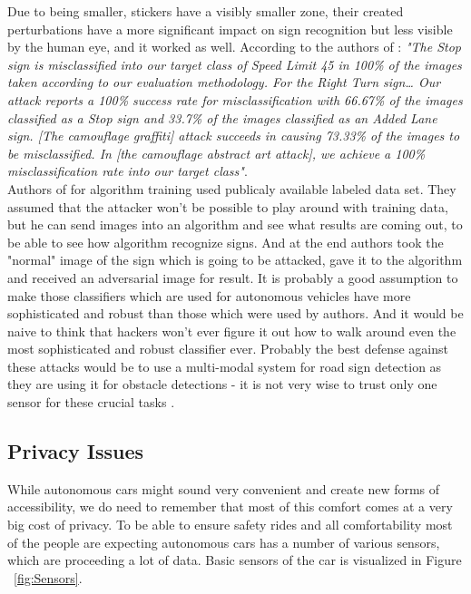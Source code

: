 Due to being smaller, stickers have a visibly smaller zone, their created perturbations have a more significant impact on sign recognition but less visible by the human eye, and it worked as well. According to the authors of \cite{signs}: \textit{"The Stop sign is misclassified into our target class of Speed Limit 45 in 100\% of the images taken according to our evaluation methodology. For the Right Turn sign… Our attack reports a 100\% success rate for misclassification with 66.67\% of the images classified as a Stop sign and 33.7\% of the images classified as an Added Lane sign. [The camouflage graffiti] attack succeeds in causing 73.33\% of the images to be misclassified. In [the camouflage abstract art attack], we achieve a 100\% misclassification rate into our target class"}. \\
Authors of \cite{signs} for algorithm training used publicaly available labeled data set. They assumed that the attacker won't be possible to play around with training data, but he can send images into an algorithm and see what results are coming out, to be able to see how algorithm recognize signs. And at the end authors took the "normal" image of the sign which is going to be attacked, gave it to the algorithm and received an adversarial image for result. It is probably a good assumption to make those classifiers which are used for autonomous vehicles have more sophisticated and robust than those which were used by authors. And it would be naive to think that hackers won't ever figure it out how to walk around even the most sophisticated and robust classifier ever. Probably the best defense against these attacks would be to use a multi-modal system for road sign detection as they are using it for obstacle detections - it is not very wise to trust only one sensor for these crucial tasks \cite{signs2}.

\subsection{Privacy Issues}

While autonomous cars might sound very convenient and create new forms of accessibility, we do need to remember that most of this comfort comes at a very big cost of privacy. To be able to ensure safety rides and all comfortability most of the people are expecting autonomous cars has a number of various sensors, which are proceeding a lot of data. Basic sensors of the car is visualized in Figure ~\ref{fig:Sensors}. \\ 

